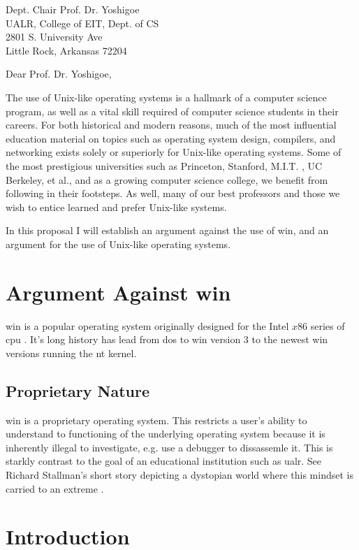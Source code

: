 \documentclass{letter}
\begin{document}
  \begin{letter}{
    Dept. Chair Prof. Dr. Yoshigoe \\
    UALR, College of EIT, Dept. of CS \\
    2801 S. University Ave \\
    Little Rock, Arkansas 72204
  }
    \opening{Dear Prof. Dr. Yoshigoe,}

    The use of Unix-like operating systems is a hallmark of a computer science program, as well as a vital skill required of computer science students in their careers. For both historical and modern reasons, much of the most influential education material on topics such as operating system design, compilers, and networking exists solely or superiorly for Unix-like operating systems. Some of the most prestigious universities such as Princeton, Stanford, M.I.T. \cite{MITLinux}, UC Berkeley, et al., and as a growing computer science college, we benefit from following in their footsteps. As well, many of our best professors and those we wish to entice learned and prefer Unix-like systems.

    In this proposal I will establish an argument against the use of \gls{win}, and an argument for the use of Unix-like operating systems.

    \section{Argument Against \gls{win}}

    \gls{win} is a popular operating system originally designed for the Intel $x$86 series of \gls{cpu} \cite{WindowsMarketShare}. It's long history has lead from \gls{dos} to \gls{win} version 3 to the newest \gls{win} versions running the \gls{nt} kernel.

    \subsection{Proprietary Nature}
    \gls{win} is a proprietary operating system. This restricts a user's ability to understand to functioning of the underlying operating system because it is inherently illegal to investigate, e.g. use a debugger to dissassemle it. This is starkly contrast to the goal of an educational institution such as \gls{ualr}. See Richard Stallman's short story depicting a dystopian world where this mindset is carried to an extreme \cite{RightToRead}.

    \section{Introduction}


\end{letter}
\end{document}
